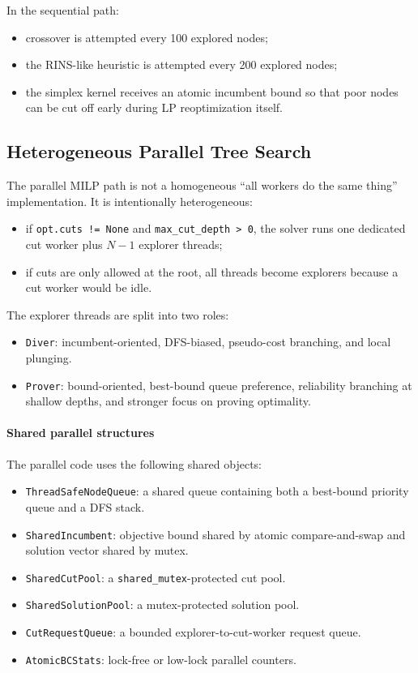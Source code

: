 In the sequential path:
\begin{itemize}
  \item crossover is attempted every 100 explored nodes;
  \item the RINS-like heuristic is attempted every 200 explored nodes;
  \item the simplex kernel receives an atomic incumbent bound so that poor nodes can be cut off early during LP reoptimization itself.
\end{itemize}

\subsection{Heterogeneous Parallel Tree Search}

The parallel MILP path is not a homogeneous ``all workers do the same thing'' implementation. It is intentionally heterogeneous:
\begin{itemize}
  \item if \texttt{opt.cuts != None} and \texttt{max\_cut\_depth > 0}, the solver runs one dedicated cut worker plus \(N-1\) explorer threads;
  \item if cuts are only allowed at the root, all threads become explorers because a cut worker would be idle.
\end{itemize}

The explorer threads are split into two roles:
\begin{itemize}
  \item \texttt{Diver}: incumbent-oriented, DFS-biased, pseudo-cost branching, and local plunging.
  \item \texttt{Prover}: bound-oriented, best-bound queue preference, reliability branching at shallow depths, and stronger focus on proving optimality.
\end{itemize}

\paragraph{Shared parallel structures}
The parallel code uses the following shared objects:
\begin{itemize}
  \item \texttt{ThreadSafeNodeQueue}: a shared queue containing both a best-bound priority queue and a DFS stack.
  \item \texttt{SharedIncumbent}: objective bound shared by atomic compare-and-swap and solution vector shared by mutex.
  \item \texttt{SharedCutPool}: a \texttt{shared\_mutex}-protected cut pool.
  \item \texttt{SharedSolutionPool}: a mutex-protected solution pool.
  \item \texttt{CutRequestQueue}: a bounded explorer-to-cut-worker request queue.
  \item \texttt{AtomicBCStats}: lock-free or low-lock parallel counters.
\end{itemize}

